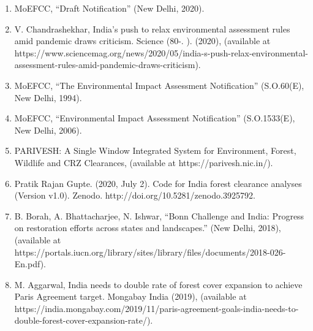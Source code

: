 \begin{refsection}
\begin{enumerate}
	\item MoEFCC, “Draft Notification” (New Delhi, 2020).
	\item V. Chandrashekhar, India’s push to relax environmental assessment rules amid pandemic draws criticism. Science (80-. ). (2020), (available at https://www.sciencemag.org/news/2020/05/india-s-push-relax-environmental-assessment-rules-amid-pandemic-draws-criticism).
	\item MoEFCC, “The Environmental Impact Assessment Notification” (S.O.60(E), New Delhi, 1994).
	\item MoEFCC, “Environmental Impact Assessment Notification” (S.O.1533(E), New Delhi, 2006).
	\item PARIVESH: A Single Window Integrated System for Environment, Forest, Wildlife and CRZ Clearances, (available at https://parivesh.nic.in/).
	\item Pratik Rajan Gupte. (2020, July 2). Code for India forest clearance analyses (Version v1.0). Zenodo. http://doi.org/10.5281/zenodo.3925792.
	\item B. Borah, A. Bhattacharjee, N. Ishwar, “Bonn Challenge and India: Progress on restoration efforts across states and landscapes.” (New Delhi, 2018), (available at https://portals.iucn.org/library/sites/library/files/documents/2018-026-En.pdf).
	\item M. Aggarwal, India needs to double rate of forest cover expansion to achieve Paris Agreement target. Mongabay India (2019), (available at https://india.mongabay.com/2019/11/paris-agreement-goals-india-needs-to-double-forest-cover-expansion-rate/).
\end{enumerate}

\newrefcontext[sorting=nyt]
\end{refsection}

\afterpage{\nopagecolor}
\pagestyle{scrheadings}
